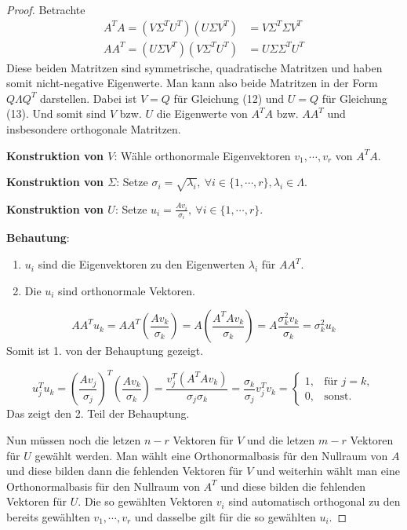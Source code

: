 \documentclass{article}
\begin{document}
\begin{proof}
    Betrachte
    \begin{align}
        A^TA = (V \Sigma^T U^T) (U \Sigma V^T) &= V \Sigma^T \Sigma V^T \\
        AA^T = (U \Sigma V^T) (V \Sigma^T U^T) &= U \Sigma \Sigma^T U^T
    \end{align}
    Diese beiden Matritzen sind symmetrische, quadratische Matritzen und haben somit
    nicht-negative Eigenwerte. Man kann also beide Matritzen in der Form $Q \Lambda Q^T$ darstellen.
    Dabei ist $V = Q$ für Gleichung (12) und $U = Q$ für Gleichung (13). Und somit sind $V$ bzw. $U$ die Eigenwerte
    von $A^TA$ bzw. $AA^T$ und insbesondere orthogonale Matritzen.

    \textbf{Konstruktion von $V$}: Wähle orthonormale Eigenvektoren $v_1, \cdots, v_r$ von $A^TA$.

    \textbf{Konstruktion von $\Sigma$}: Setze $\sigma_i = \sqrt{\lambda_i}, \: \forall i \in \{1, \cdots, r\}, \lambda_i \in \Lambda$.

    \textbf{Konstruktion von $U$}: Setze $u_i = \frac{Av_i}{\sigma_i}, \: \forall i \in \{1, \cdots, r\}$.
    
    \textbf{Behautung}: 
    \begin{enumerate}
        \item $u_i$ sind die Eigenvektoren zu den Eigenwerten $\lambda_i$ für $AA^T$.
        \item Die $u_i$ sind orthonormale Vektoren.
    \end{enumerate}
    \begin{equation*}
        AA^Tu_k = AA^T\left(\frac{Av_k}{\sigma_k}\right) = A\left(\frac{A^TAv_k}{\sigma_k}\right) = A\frac{\sigma_k^2v_k}{\sigma_k} = \sigma_k^2u_k
    \end{equation*}
    Somit ist 1. von der Behauptung gezeigt.

    \begin{equation*}
        u_j^Tu_k = \left(\frac{Av_j}{\sigma_j}\right)^T\left(\frac{Av_k}{\sigma_k}\right) = \frac{v_j^T(A^TAv_k)}{\sigma_j\sigma_k} = \frac{\sigma_k}{\sigma_j}v_j^Tv_k = \begin{cases}
            1, &\text{für } j = k,\\
            0, &\text{sonst}.
        \end{cases}
    \end{equation*}
    Das zeigt den 2. Teil der Behauptung.

    Nun müssen noch die letzen $n - r$ Vektoren für $V$ und die letzen $m - r$ Vektoren für $U$ gewählt werden.
    Man wählt eine Orthonormalbasis für den Nullraum von $A$ und diese bilden dann die fehlenden Vektoren für $V$ 
    und weiterhin wählt man eine Orthonormalbasis für den Nullraum von $A^T$ und diese bilden die fehlenden Vektoren für $U$.
    Die so gewählten Vektoren $v_i$ sind automatisch orthogonal zu den bereits gewählten $v_1, \cdots, v_r$ 
    und dasselbe gilt für die so gewählten $u_i$. 
\end{proof}
\end{document}
